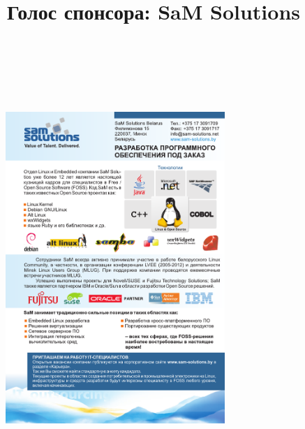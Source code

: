 \documentclass[10pt, a5paper]{article}
\begin{document}
\title{Голос спонсора: SaM Solutions}
\date{}
\maketitle

~

\newpage

~

\begin{figure}[h!]
\centering
\includegraphics[height=11.8cm]{48_spons_sams.pdf}
\end{figure}
\end{document}

